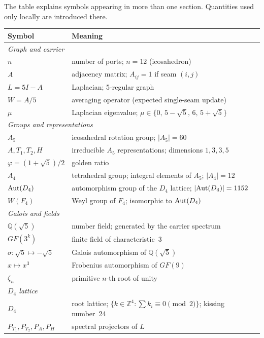 The table explains symbols appearing in more than one section.
Quantities used only locally are introduced there.

\medskip
\begin{tabular}{@{}lp{11cm}@{}}
\toprule
\textbf{Symbol} & \textbf{Meaning} \\
\midrule
\multicolumn{2}{l}{\textit{Graph and carrier}} \\
$n$ & number of ports; $n=12$ (icosahedron) \\
$A$ & adjacency matrix; $A_{ij}=1$ if seam $(i,j)$ \\
$L=5I-A$ & Laplacian; 5-regular graph \\
$W=A/5$ & averaging operator (expected single-seam update) \\
$\mu$ & Laplacian eigenvalue; $\mu\in\{0,\,5{-}\sqrt5,\,6,\,5{+}\sqrt5\}$ \\
\midrule
\multicolumn{2}{l}{\textit{Groups and representations}} \\
$A_5$ & icosahedral rotation group; $|A_5|=60$ \\
$A,T_1,T_2,H$ & irreducible $A_5$ representations; dimensions $1,3,3,5$ \\
$\varphi=(1{+}\sqrt5)/2$ & golden ratio \\
$A_4$ & tetrahedral group; integral elements of $A_5$; $|A_4|=12$ \\
${\rm Aut}(D_4)$ & automorphism group of the $D_4$ lattice; $|{\rm Aut}(D_4)|=1152$ \\
$W(F_4)$ & Weyl group of $F_4$; isomorphic to ${\rm Aut}(D_4)$ \\
\midrule
\multicolumn{2}{l}{\textit{Galois and fields}} \\
$\mathbb{Q}(\sqrt5)$ & number field; generated by the carrier spectrum \\
$GF(3^k)$ & finite field of characteristic~3 \\
$\sigma:\sqrt5\mapsto-\sqrt5$ & Galois automorphism of $\mathbb{Q}(\sqrt5)$ \\
$x\mapsto x^3$ & Frobenius automorphism of $GF(9)$ \\
$\zeta_n$ & primitive $n$-th root of unity \\
\midrule
\multicolumn{2}{l}{\textit{$D_4$ lattice}} \\
$D_4$ & root lattice; $\{k\in\mathbb{Z}^4:\sum k_i\equiv0\pmod2\}$; kissing number~24 \\
$P_{T_1},P_{T_2},P_A,P_H$ & spectral projectors of $L$ \\
\bottomrule
\end{tabular}


